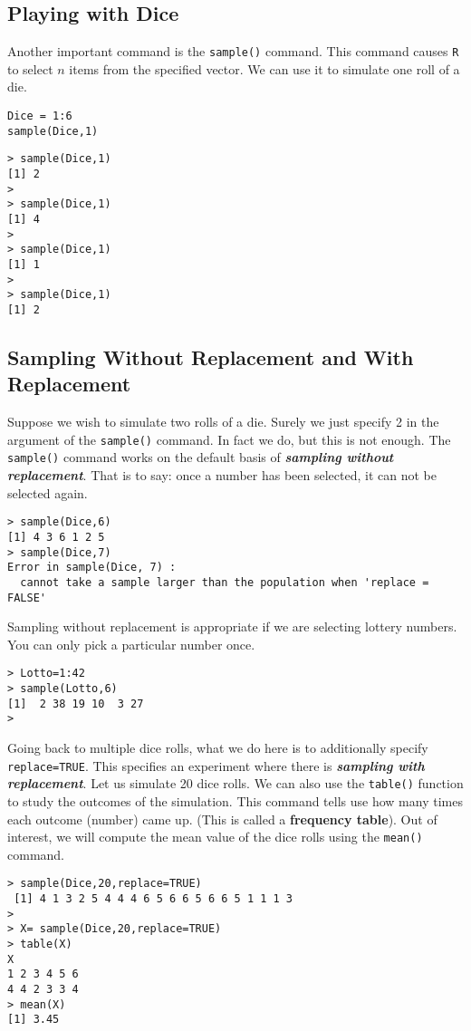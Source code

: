 \documentclass[11pt]{article} %
\begin{document}
\subsection{Playing with Dice}


Another important command is the \texttt{sample()} command. This command causes \texttt{R} to select $n$ items from the specified vector. We can use it to simulate one roll of a die.
\begin{framed}
\begin{verbatim}
Dice = 1:6
sample(Dice,1)
\end{verbatim}
\end{framed}
\begin{verbatim}
> sample(Dice,1)
[1] 2 
> 
> sample(Dice,1)
[1] 4 
>
> sample(Dice,1)
[1] 1
> 
> sample(Dice,1)
[1] 2
\end{verbatim}

\subsection{Sampling Without Replacement and With Replacement}
\noindent Suppose we wish to simulate two rolls of a die. Surely we just specify 2 in the argument of the \texttt{sample()} command. In fact we do, but this is not enough.
The \texttt{sample()} command works on the default basis of \textbf{\textit{sampling without replacement}}. That is to say: once a number has been selected, it can not be selected again.
\begin{verbatim}
> sample(Dice,6)
[1] 4 3 6 1 2 5
> sample(Dice,7)
Error in sample(Dice, 7) : 
  cannot take a sample larger than the population when 'replace = FALSE'
\end{verbatim}
Sampling without replacement is appropriate if we are selecting lottery numbers. You can only pick a particular number once.
\begin{verbatim}
> Lotto=1:42
> sample(Lotto,6)
[1]  2 38 19 10  3 27
> 
\end{verbatim}

Going back to multiple dice rolls, what we do here is to additionally specify \texttt{replace=TRUE}. This specifies an experiment where there is \textbf{\textit{sampling with replacement}}. Let us simulate 20 dice rolls. We can also use the \texttt{table()} function to study the outcomes of the simulation. This command tells use how many times each outcome (number) came up. (This is called a \textbf{frequency table}). Out of interest, we will compute the mean value of the dice rolls using the \texttt{mean()} command.
\begin{verbatim}
> sample(Dice,20,replace=TRUE)
 [1] 4 1 3 2 5 4 4 4 6 5 6 6 5 6 6 5 1 1 1 3
>
> X= sample(Dice,20,replace=TRUE)
> table(X)
X
1 2 3 4 5 6 
4 4 2 3 3 4 
> mean(X)
[1] 3.45
\end{verbatim}
\end{document}
